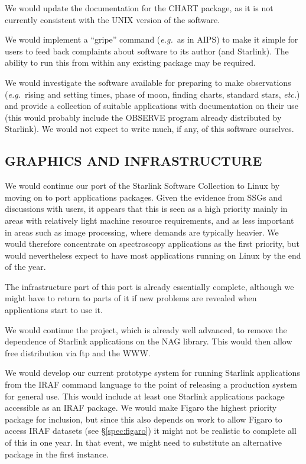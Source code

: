 {We would update the documentation for the CHART package, as it is not
currently consistent with the UNIX version of the software.}

{We would implement a ``gripe'' command ({\em e.g.}\ as in AIPS) to
make it simple for users to feed back complaints about software to its
author (and Starlink). The ability to run this from within any
existing package may be required.}

{We would investigate the software available for preparing to make
observations ({\em e.g.}\ rising and setting times, phase of moon,
finding charts, standard stars, {\em etc.}) and provide a collection
of suitable applications with documentation on their use (this would
probably include the OBSERVE program already distributed by Starlink). We would
not expect to write much, if any, of this software ourselves.}

\subsection{\label{infra}GRAPHICS AND INFRASTRUCTURE}

{We would continue our port of the Starlink Software Collection to
Linux by moving on to port applications packages. Given the evidence
from SSGs and discussions with users, it appears that this is seen as a
high priority mainly in areas with relatively light machine
resource requirements, and as less important in areas such as image
processing, where demands are typically heavier. We would therefore
concentrate on spectroscopy applications as the first priority, but
would nevertheless expect to have most applications running on Linux
by the end of the year.

The infrastructure part of this port is already essentially complete,
although we might have to return to parts of it if new problems are
revealed when applications start to use it.}

{We would continue the project, which is already well advanced, to
remove the dependence of Starlink applications on the NAG
library. This would then allow free distribution via ftp and the WWW.}

{We would develop our current prototype system for running Starlink
applications from the IRAF command language to the point of releasing
a production system for general use. This would include at least one
Starlink applications package accessible as an IRAF package. We would
make Figaro the highest priority package for inclusion, but since this
also depends on work to allow Figaro to access IRAF datasets (see
\S\ref{spec:figaro}) it might not be realistic to complete all of this in one
year. In that event, we might need to substitute an alternative
package in the first instance.}


